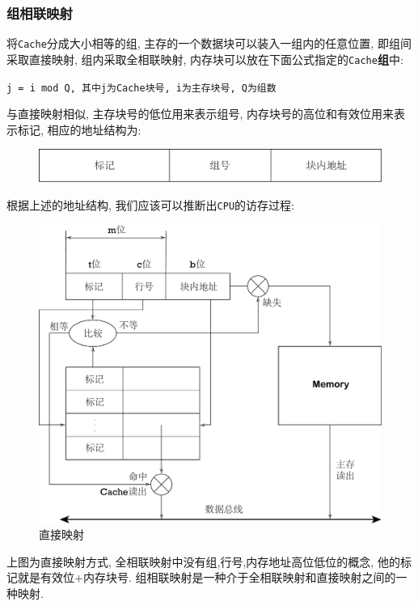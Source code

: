 \subsubsection{组相联映射}
将\verb|Cache|分成大小相等的组, 主存的一个数据块可以装入一组内的任意位置, 即组间采取直接映射, 组内采取全相联映射, 内存块可以放在下面公式指定的\verb|Cache|\textbf{组}中:
\begin{center}
\verb|j = i mod Q, 其中j为Cache块号, i为主存块号, Q为组数|
\end{center}\par 
与直接映射相似, 主存块号的低位用来表示组号, 内存块号的高位和有效位用来表示标记, 相应的地址结构为:
\begin{figure}[H]
\centering
\includegraphics[scale=.5]{img/figure14.pdf}
\end{figure}
根据上述的地址结构, 我们应该可以推断出\verb|CPU|的访存过程:
\begin{figure}[H]
\centering
\includegraphics[scale=.4]{img/figure16.pdf}
\caption*{直接映射}
\end{figure}\par
上图为直接映射方式, 全相联映射中没有组,行号,内存地址高位低位的概念, 他的标记就是有效位+内存块号. 组相联映射是一种介于全相联映射和直接映射之间的一种映射.
